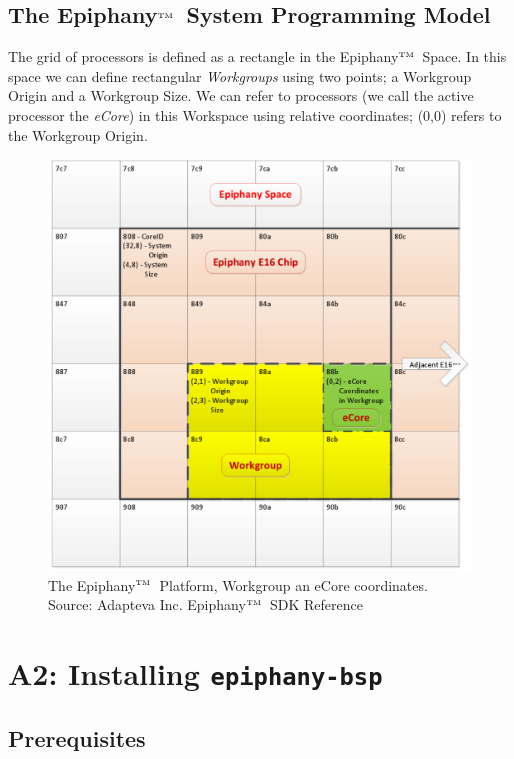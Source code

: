 \documentclass[fleqn]{article}
\renewcommand{\(}{\left(}
\renewcommand{\)}{\right)}
\def\tm{$^{\hbox{\tiny TM}}$~}
\begin{document}
\subsection{The Epiphany\tm System Programming Model}
The grid of processors is defined as a rectangle in the Epiphany\tm Space. In this space we can define rectangular \textit{Workgroups} using two points; a Workgroup Origin and a Workgroup Size. We can refer to processors (we call the active processor the \textit{eCore}) in this Workspace using relative coordinates; (0,0) refers to the Workgroup Origin.

\begin{centering}
\begin{figure}
\centering
\includegraphics[scale=0.5]{EpiphanySpace.pdf}
\caption{The Epiphany\tm Platform, Workgroup an eCore coordinates. Source: Adapteva Inc. Epiphany\tm SDK Reference}
\end{figure}
\end{centering}

\section{A2: Installing \texttt{epiphany-bsp}}

\subsection{Prerequisites}
\end{document}
